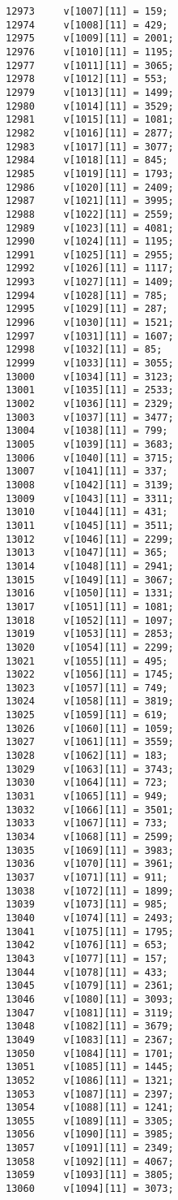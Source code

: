 \begin{Code}
\begin{verbatim}
12973     v[1007][11] = 159;
12974     v[1008][11] = 429;
12975     v[1009][11] = 2001;
12976     v[1010][11] = 1195;
12977     v[1011][11] = 3065;
12978     v[1012][11] = 553;
12979     v[1013][11] = 1499;
12980     v[1014][11] = 3529;
12981     v[1015][11] = 1081;
12982     v[1016][11] = 2877;
12983     v[1017][11] = 3077;
12984     v[1018][11] = 845;
12985     v[1019][11] = 1793;
12986     v[1020][11] = 2409;
12987     v[1021][11] = 3995;
12988     v[1022][11] = 2559;
12989     v[1023][11] = 4081;
12990     v[1024][11] = 1195;
12991     v[1025][11] = 2955;
12992     v[1026][11] = 1117;
12993     v[1027][11] = 1409;
12994     v[1028][11] = 785;
12995     v[1029][11] = 287;
12996     v[1030][11] = 1521;
12997     v[1031][11] = 1607;
12998     v[1032][11] = 85;
12999     v[1033][11] = 3055;
13000     v[1034][11] = 3123;
13001     v[1035][11] = 2533;
13002     v[1036][11] = 2329;
13003     v[1037][11] = 3477;
13004     v[1038][11] = 799;
13005     v[1039][11] = 3683;
13006     v[1040][11] = 3715;
13007     v[1041][11] = 337;
13008     v[1042][11] = 3139;
13009     v[1043][11] = 3311;
13010     v[1044][11] = 431;
13011     v[1045][11] = 3511;
13012     v[1046][11] = 2299;
13013     v[1047][11] = 365;
13014     v[1048][11] = 2941;
13015     v[1049][11] = 3067;
13016     v[1050][11] = 1331;
13017     v[1051][11] = 1081;
13018     v[1052][11] = 1097;
13019     v[1053][11] = 2853;
13020     v[1054][11] = 2299;
13021     v[1055][11] = 495;
13022     v[1056][11] = 1745;
13023     v[1057][11] = 749;
13024     v[1058][11] = 3819;
13025     v[1059][11] = 619;
13026     v[1060][11] = 1059;
13027     v[1061][11] = 3559;
13028     v[1062][11] = 183;
13029     v[1063][11] = 3743;
13030     v[1064][11] = 723;
13031     v[1065][11] = 949;
13032     v[1066][11] = 3501;
13033     v[1067][11] = 733;
13034     v[1068][11] = 2599;
13035     v[1069][11] = 3983;
13036     v[1070][11] = 3961;
13037     v[1071][11] = 911;
13038     v[1072][11] = 1899;
13039     v[1073][11] = 985;
13040     v[1074][11] = 2493;
13041     v[1075][11] = 1795;
13042     v[1076][11] = 653;
13043     v[1077][11] = 157;
13044     v[1078][11] = 433;
13045     v[1079][11] = 2361;
13046     v[1080][11] = 3093;
13047     v[1081][11] = 3119;
13048     v[1082][11] = 3679;
13049     v[1083][11] = 2367;
13050     v[1084][11] = 1701;
13051     v[1085][11] = 1445;
13052     v[1086][11] = 1321;
13053     v[1087][11] = 2397;
13054     v[1088][11] = 1241;
13055     v[1089][11] = 3305;
13056     v[1090][11] = 3985;
13057     v[1091][11] = 2349;
13058     v[1092][11] = 4067;
13059     v[1093][11] = 3805;
13060     v[1094][11] = 3073;

\end{verbatim}
\end{Code}

